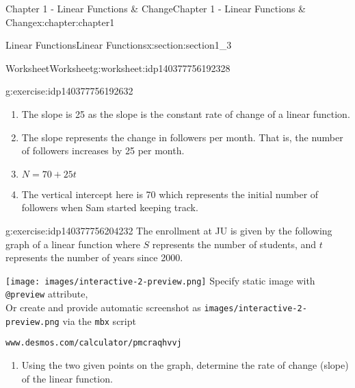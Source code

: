 \documentclass[oneside,10pt,]{book}
\newcommand{\mono}[1]{\texttt{#1}}
\newlength{\qrsize}
\newlength{\previewwidth}
\begin{document}
\begin{chapterptx}{Chapter 1 - Linear Functions \& Change}{}{Chapter 1 - Linear Functions \& Change}{}{}{x:chapter:chapter1}
\begin{sectionptx}{Linear Functions}{}{Linear Functions}{}{}{x:section:section1_3}
\begin{worksheet-subsection}{Worksheet}{}{Worksheet}{}{}{g:worksheet:idp140377756192328}
\begin{divisionexercise}{1}{}{}{g:exercise:idp140377756192632}
\begin{enumerate}[label=(\alph*)]
%
\begin{equation*}
RoC_{7\leq t \leq 10} = \frac{320-245}{10-7} = 25 \text{ followers per month}
\end{equation*}
From this data, the function looks linear as the rate of change is constant over every interval.%
\item{}The slope is 25 as the slope is the constant rate of change of a linear function.%
\item{}The slope represents the change in followers per month. That is, the number of followers increases by 25 per month.%
\item{}\(\displaystyle N= 70+25t \)%
\item{}The vertical intercept here is 70 which represents the initial number of followers when Sam started keeping track.%
\end{enumerate}
\end{divisionexercise}%
\begin{divisionexercise}{2}{}{}{g:exercise:idp140377756204232}%
The enrollment at JU is given by the following graph of a linear function where \(S\) represents the number of students, and \(t\) represents the number of years since 2000. \setlength{\qrsize}{9em}
\setlength{\previewwidth}{\linewidth}
\addtolength{\previewwidth}{-\qrsize}
\begin{tcbraster}[raster columns=2, raster column skip=1pt, raster halign=center, raster force size=false, raster left skip=0pt, raster right skip=0pt]%
\begin{tcolorbox}[previewstyle, width=\previewwidth]%
%
{\texttt{[image: images/interactive-2-preview.png]}}%
{\small{}Specify static image with \mono{@preview} attribute,\\Or create and provide automatic screenshot as \mono{images/interactive-2-preview.png} via the \mono{mbx} script}%
\end{tcolorbox}%
\begin{tcolorbox}[qrstyle]%
{\hypersetup{urlcolor=black}}%
\end{tcolorbox}%
\begin{tcolorbox}[captionstyle]%
\small \mono{www.desmos.com/calculator/pmcraqhvvj}\end{tcolorbox}%
\end{tcbraster}%
%
%
\begin{enumerate}[label=(\alph*)]
\item{}Using the two given points on the graph, determine the rate of change (slope) of the linear function.%

\end{enumerate}
\end{divisionexercise}
\end{worksheet-subsection}
\end{sectionptx}
\end{chapterptx}
\end{document}
